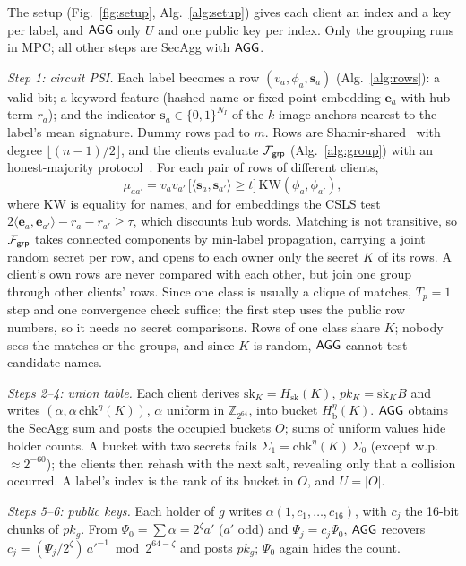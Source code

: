 The setup (Fig.~\ref{fig:setup}, Alg.~\ref{alg:setup}) gives each client an index and a key per
label, and $\mathsf{AGG}$ only $U$ and one public key per index. Only the grouping runs in MPC; all other
steps are SecAgg with $\mathsf{AGG}$.

\emph{Step 1: circuit PSI.} Each label becomes a row $(v_a,\phi_a,\mathbf{s}_a)$
(Alg.~\ref{alg:rows}): a valid bit; a keyword feature (hashed name or
fixed-point embedding $\mathbf{e}_a$ with hub term $r_a$); and the indicator
$\mathbf{s}_a\in\{0,1\}^{N_I}$ of the $k$ image anchors nearest to the label's mean signature.
Dummy rows pad to $m$. Rows are Shamir-shared~\cite{shamir1979share} with degree
$\lfloor(n-1)/2\rfloor$, and the clients evaluate $\mathcal{F}_{\mathsf{grp}}$ (Alg.~\ref{alg:group}) with an
honest-majority protocol~\cite{damgard2007scalable}. For each pair of rows of different clients,
\begin{equation}
  \mu_{aa'}=v_a v_{a'}\,\big[\langle\mathbf{s}_a,\mathbf{s}_{a'}\rangle\ge t\big]\,
  \mathrm{KW}(\phi_a,\phi_{a'}),
  \label{eq:match}
\end{equation}
where $\mathrm{KW}$ is equality for names, and for embeddings the CSLS
test~\cite{conneau2018word} $2\langle\mathbf{e}_a,\mathbf{e}_{a'}\rangle-r_a-r_{a'}\ge\tau$, which
discounts hub words. Matching is not transitive, so $\mathcal{F}_{\mathsf{grp}}$ takes connected components by min-label
propagation, carrying a joint random secret per row, and opens to each owner only the secret $K$ of
its rows. A client's own rows are never compared with each other, but join one group through other
clients' rows. Since one class is usually a clique of matches, $T_p=1$ step and one convergence
check suffice; the first step uses the public row numbers, so it needs no secret comparisons. Rows of one class share $K$; nobody sees the matches or the groups, and since $K$ is
random, $\mathsf{AGG}$ cannot test candidate names.

\emph{Steps 2--4: union table.} Each client derives $\mathrm{sk}_K=H_{\mathrm{sk}}(K)$,
$pk_K=\mathrm{sk}_K B$ and writes $(\alpha,\alpha\,\mathrm{chk}^{\eta}(K))$, $\alpha$ uniform in
$\mathbb{Z}_{2^{64}}$, into bucket $H_{\mathrm b}^{\eta}(K)$. $\mathsf{AGG}$ obtains the SecAgg sum and posts
the occupied buckets $O$; sums of uniform values hide holder counts. A bucket with two secrets
fails $\Sigma_1=\mathrm{chk}^{\eta}(K)\,\Sigma_0$ (except w.p.\ ${\approx}2^{-60}$); the clients then
rehash with the next salt, revealing only that a collision occurred. A label's index is the rank of
its bucket in $O$, and $U=|O|$.

\emph{Steps 5--6: public keys.} Each holder of $g$ writes $\alpha(1,c_1,\dots,c_{16})$, with $c_j$
the 16-bit chunks of $pk_g$. From $\Psi_0=\sum\alpha=2^{\zeta}a'$ ($a'$ odd) and $\Psi_j=c_j\Psi_0$,
$\mathsf{AGG}$ recovers $c_j=(\Psi_j/2^{\zeta})\,a'^{-1}\bmod 2^{64-\zeta}$ and posts $pk_g$; $\Psi_0$ again
hides the count.

